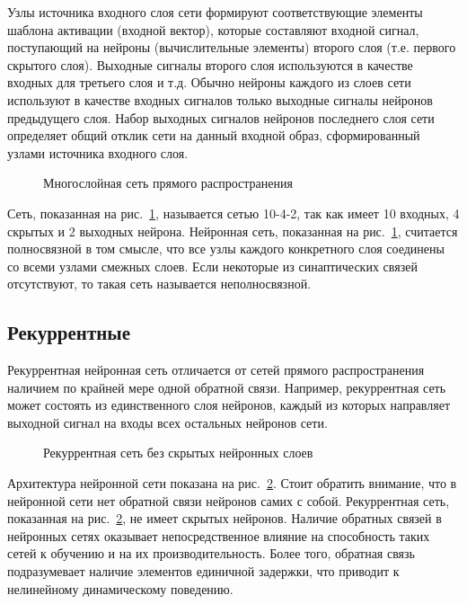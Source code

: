 Узлы источника входного слоя сети формируют соответствующие элементы шаблона активации (входной  вектор), которые составляют входной сигнал, поступающий на нейроны (вычислительные элементы) второго слоя (т.е. первого скрытого слоя).
Выходные сигналы второго слоя используются в качестве входных для третьего слоя и т.д.
Обычно нейроны каждого из слоев сети используют в качестве входных сигналов только выходные сигналы нейронов предыдущего слоя.
Набор выходных сигналов нейронов последнего слоя сети определяет общий отклик сети на данный входной образ, сформированный узлами источника входного слоя.

\begin{figure}[h]
\caption{Многослойная сеть прямого распространения}
\label{ris:ManyLayer}
\end{figure}

Сеть, показанная на рис.~\ref{ris:ManyLayer}, называется сетью 10-4-2, так как имеет 10 входных, 4 скрытых и 2 выходных нейрона.
Нейронная сеть, показанная на рис.~\ref{ris:ManyLayer}, считается полносвязной в том смысле, что все узлы каждого конкретного слоя соединены со всеми узлами смежных слоев.
Если некоторые из синаптических связей отсутствуют, то такая сеть называется неполносвязной.\cite{NejronnyeSeti}

\subsection{Рекуррентные}
Рекуррентная нейронная сеть отличается от сетей прямого распространения наличием по крайней мере одной обратной связи.
Например, рекуррентная сеть может состоять из единственного слоя нейронов, каждый из которых направляет выходной сигнал на входы всех остальных нейронов сети.

\begin{figure}[h]
\caption{Рекуррентная сеть без скрытых нейронных слоев}
\label{ris:Recurrent}
\end{figure}

Архитектура нейронной сети показана на рис.~\ref{ris:Recurrent}.
Стоит обратить внимание, что в нейронной сети нет обратной связи нейронов самих с собой.
Рекуррентная сеть, показанная на рис.~\ref{ris:Recurrent}, не имеет скрытых нейронов.
Наличие обратных связей в нейронных сетях оказывает непосредственное влияние на способность таких сетей к обучению и на их производительность.
Более того, обратная связь подразумевает наличие элементов единичной задержки, что приводит к нелинейному динамическому поведению.\cite{NejronnyeSeti}